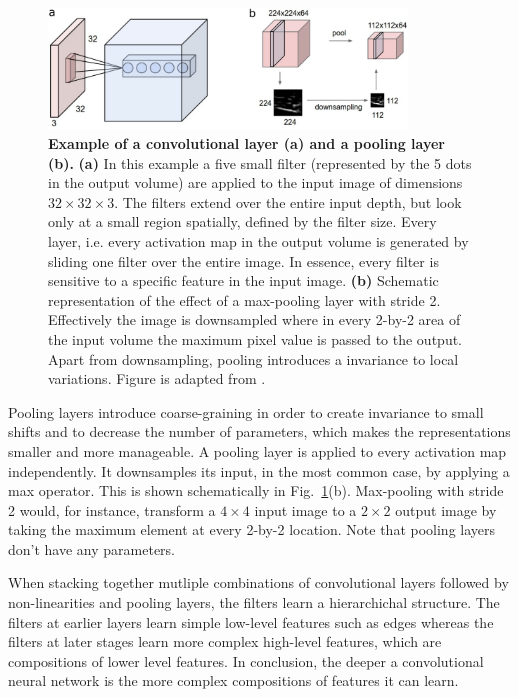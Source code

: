 \begin{figure}[h!]
	\centering
	\captionsetup{width=1\linewidth}
	\includegraphics[width=0.85\textwidth]{Figures/conv_pooling.pdf}
	\caption{\textbf{Example of a convolutional layer (a) and a pooling layer (b).} \textbf{(a)} In this example a five small filter (represented by the 5 dots in the output volume) are applied to the input image of dimensions $32\times32\times3$. The filters extend over the entire input depth, but look only at a small region spatially, defined by the filter size. Every layer, i.e. every activation map in the output volume is generated by sliding one filter over the entire image. In essence, every filter is sensitive to a specific feature in the input image. \textbf{(b)} Schematic representation of the effect of a max-pooling layer with stride 2. Effectively the image is downsampled where in every 2-by-2 area of the input volume the maximum pixel value is passed to the output. Apart from downsampling, pooling introduces a invariance to local variations. Figure is adapted from \parencite{cs231}.
}
	\label{fig:conv_pooling}
\end{figure}

Pooling layers introduce coarse-graining in order to create invariance to small shifts and to decrease the number of parameters, which makes the representations smaller and more manageable. A pooling layer is applied to every activation map independently. It downsamples its input, in the most common case, by applying a max operator. This is shown schematically in Fig.~\ref{fig:conv_pooling}(b). Max-pooling with stride 2 would, for instance, transform a $4 \times 4$ input image to a $2 \times 2$ output image by taking the maximum element at every 2-by-2 location. Note that pooling layers don't have any parameters.

When stacking together mutliple combinations of convolutional layers followed by non-linearities and pooling layers, the filters learn a hierarchichal structure. The filters at earlier layers learn simple low-level features such as edges whereas the filters at later stages learn more complex high-level features, which are compositions of lower level features. In conclusion, the deeper a convolutional neural network is the more complex compositions of features it can learn.

